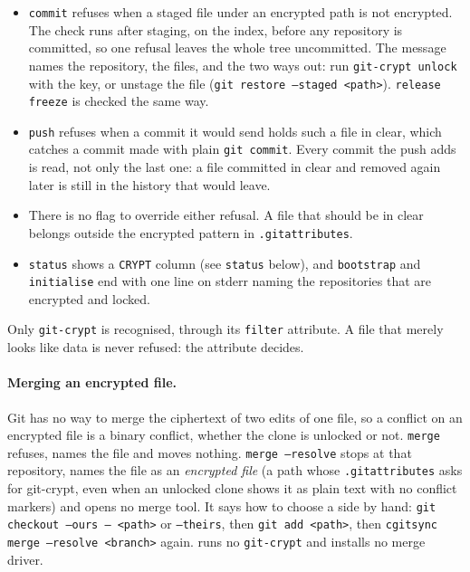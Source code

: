 \begin{itemize}
  \item \texttt{commit} refuses when a staged file under an encrypted path is
    not encrypted. The check runs after staging, on the index, before any
    repository is committed, so one refusal leaves the whole tree
    uncommitted. The message names the repository, the files, and the two
    ways out: run \texttt{git-crypt unlock} with the key, or unstage the file
    (\texttt{git restore --staged <path>}). \texttt{release freeze} is
    checked the same way.
  \item \texttt{push} refuses when a commit it would send holds such a file in
    clear, which catches a commit made with plain \texttt{git commit}. Every
    commit the push adds is read, not only the last one: a file committed in
    clear and removed again later is still in the history that would leave.
  \item There is no flag to override either refusal. A file that should be in
    clear belongs outside the encrypted pattern in \texttt{.gitattributes}.
  \item \texttt{status} shows a \texttt{CRYPT} column (see
    \texttt{status} below), and \texttt{bootstrap} and \texttt{initialise}
    end with one line on stderr naming the repositories that are encrypted
    and locked.
\end{itemize}

Only \texttt{git-crypt} is recognised, through its \texttt{filter}
attribute. A file that merely looks like data is never refused: the
attribute decides.

\paragraph{Merging an encrypted file.} Git has no way to merge the
ciphertext of two edits of one file, so a conflict on an encrypted file is a
binary conflict, whether the clone is unlocked or not. \texttt{merge} refuses,
names the file and moves nothing. \texttt{merge --resolve} stops at that
repository, names the file as an \emph{encrypted file} (a path whose
\texttt{.gitattributes} asks for git-crypt, even when an unlocked clone shows
it as plain text with no conflict markers) and opens no merge tool. It says how
to choose a side by hand: \texttt{git checkout --ours -- <path>} or
\texttt{--theirs}, then \texttt{git add <path>}, then
\texttt{cgitsync merge --resolve <branch>} again. \cgscli{} runs no
\texttt{git-crypt} and installs no merge driver.

